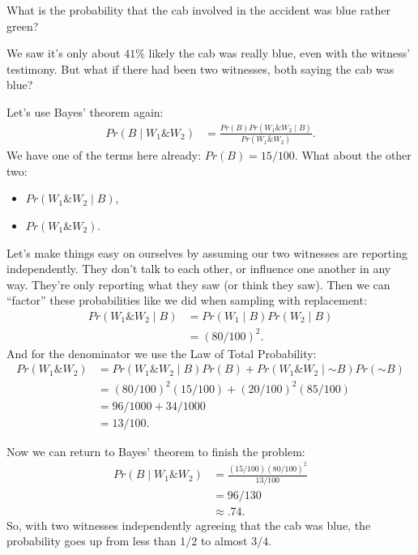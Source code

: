 \documentclass[justified]{tufte-book}
\providecommand{\tightlist}{%
  \setlength{\itemsep}{0pt}\setlength{\parskip}{0pt}}
\newcommand{\given}{\mid}
\renewcommand{\neg}{\mathbin{\sim}}
\renewcommand{\wedge}{\mathbin{\&}}
\newcommand{\p}{Pr}
\theoremstyle{definition}
\theoremstyle{definition}
\theoremstyle{definition}
\theoremstyle{remark}
\begin{document}
What is the probability that the cab involved in the accident was blue
rather green?

We saw it's only about \(41\%\) likely the cab was really blue, even
with the witness' testimony. But what if there had been two witnesses,
both saying the cab was blue?

Let's use Bayes' theorem again: \[
  \begin{aligned}
    \p(B \given W_1 \wedge W_2) &= \frac{\p(B)\p(W_1 \wedge W_2 \given B)}{\p(W_1 \wedge W_2)}.
  \end{aligned}
\] We have one of the terms here already: \(\p(B) = 15/100\). What about
the other two:

\begin{itemize}
\tightlist
\item
  \(\p(W_1 \wedge W_2 \given B)\),
\item
  \(\p(W_1 \wedge W_2)\).
\end{itemize}

Let's make things easy on ourselves by assuming our two witnesses are
reporting independently. They don't talk to each other, or influence one
another in any way. They're only reporting what they saw (or think they
saw). Then we can ``factor'' these probabilities like we did when
sampling with replacement: \[
  \begin{aligned}
    \p(W_1 \wedge W_2 \given B) &= \p(W_1 \given B) \p(W_2 \given B)\\
                                &= (80/100)^2.
  \end{aligned}
\] And for the denominator we use the Law of Total Probability: \[
  \begin{aligned}
    \p(W_1 \wedge W_2) &= \p(W_1 \wedge W_2 \given B)\p(B) + 
                          \p(W_1 \wedge W_2 \given \neg B)\p(\neg B)\\
                       &= (80/100)^2(15/100) + (20/100)^2(85/100)\\
                       &= 96/1000 + 34/1000\\
                       &= 13/100.
  \end{aligned}
\]

Now we can return to Bayes' theorem to finish the problem: \[
  \begin{aligned}
    \p(B \given W_1 \wedge W_2) &= \frac{(15/100)(80/100)^2}{13/100}\\
                                &= 96/130\\
                                &\approx .74.
  \end{aligned}
\] So, with two witnesses independently agreeing that the cab was blue,
the probability goes up from less than \(1/2\) to almost \(3/4\).
\end{document}
